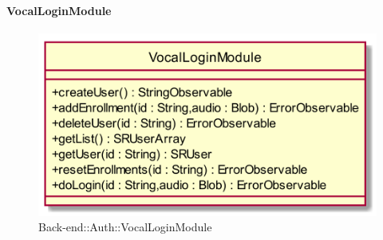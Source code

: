 \hypertarget{VocalLoginModule_label}{\paragraph{VocalLoginModule}}
\begin{figure}[h]
	\centering
	\includegraphics[width=\textwidth,height=\textheight,keepaspectratio]{images/ClassVocalLoginModule.png}
	\caption{Back-end::Auth::VocalLoginModule}
\end{figure}
